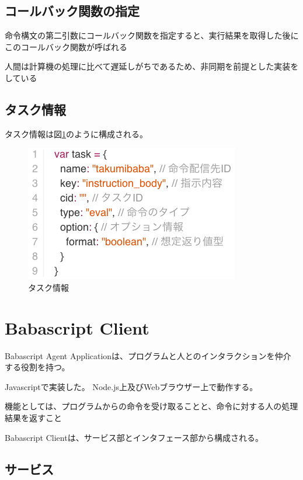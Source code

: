 \subsection{コールバック関数の指定}\label{ux30b3ux30fcux30ebux30d0ux30c3ux30afux95a2ux6570ux306eux6307ux5b9a}

命令構文の第二引数にコールバック関数を指定すると、実行結果を取得した後にこのコールバック関数が呼ばれる

人間は計算機の処理に比べて遅延しがちであるため、非同期を前提とした実装をしている

\subsection{タスク情報}\label{ux30bfux30b9ux30afux60c5ux5831}

タスク情報は図\ref{fig:task_format}のように構成される。

\begin{figure}[htbp]
  \begin{center}
  \includegraphics[width=.6\linewidth,bb=0 0 354 225]{images/task_format.js.png}
  \end{center}
  \caption{タスク情報}
  \label{fig:task_format}
\end{figure}

\section{Babascript Client}\label{babascript-client}

Babascript Agent
Applicationは、プログラムと人とのインタラクションを仲介する役割を持つ。

Javascriptで実装した。 Node.js上及びWebブラウザー上で動作する。

機能としては、プログラムからの命令を受け取ることと、命令に対する人の処理結果を返すこと

Babascript Clientは、サービス部とインタフェース部から構成される。

\subsection{サービス}\label{ux30b5ux30fcux30d3ux30b9}


